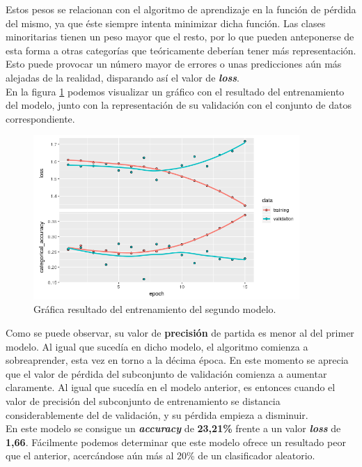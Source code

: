 \documentclass[]{article}
\begin{document}
		Estos pesos se relacionan con el algoritmo de aprendizaje en la función de pérdida del mismo, ya que éste siempre intenta minimizar dicha función. Las clases minoritarias tienen un peso mayor que el resto, por lo que pueden anteponerse de esta forma a otras categorías que teóricamente deberían tener más representación. Esto puede provocar un número mayor de errores o unas predicciones aún más alejadas de la realidad, disparando así el valor de \textbf{\textit{loss}}.\\
		
		En la figura \ref{second-nn} podemos visualizar un gráfico con el resultado del entrenamiento del modelo, junto con la representación de su validación con el conjunto de datos correspondiente.\\
	
		\begin{figure}[h]
			\centering
			\includegraphics[width=0.9\textwidth]{./img/model2}
			\caption{Gráfica resultado del entrenamiento del segundo modelo.}
			\label{second-nn}
		\end{figure}
	
		Como se puede observar, su valor de \textbf{precisión} de partida es menor al del primer modelo. Al igual que sucedía en dicho modelo, el algoritmo comienza a sobreaprender, esta vez en torno a la décima época. En este momento se aprecia que el valor de pérdida del subconjunto de validación comienza a aumentar claramente. Al igual que sucedía en el modelo anterior, es entonces cuando el valor de precisión del subconjunto de entrenamiento se distancia considerablemente del de validación, y su pérdida empieza a disminuir.\\
		
		En este modelo se consigue un \textbf{\textit{accuracy}} de \textbf{23,21\%} frente a un valor \textbf{\textit{loss}} de \textbf{1,66}. Fácilmente podemos determinar que este modelo ofrece un resultado peor que el anterior, acercándose aún más al 20\% de un clasificador aleatorio. 
	
\end{document}
